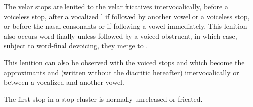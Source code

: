 \xe

\par The velar stops  are lenited to the velar fricatives  intervocalically, before a voiceless stop, after a vocalized l if followed by another vowel or a voiceless stop, or before the nasal consonants  or  if following a vowel immediately. This lenition also occurs word-finally unless followed by a voiced obstruent, in which case, subject to word-final devoicing, they merge to .
\xe

\par This lenition can also be observed with the voiced stops  and  which become the approximants  and  (written without the diacritic hereafter) intervocalically or between a vocalized  and another vowel.
\xe

The first stop in a stop cluster is normally unreleased or fricated.

\xe

